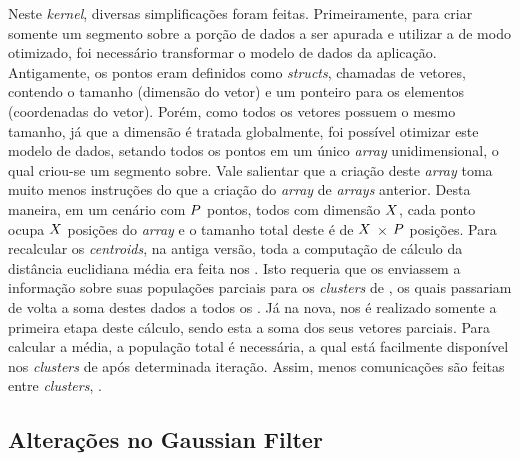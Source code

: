 \documentclass[a4paper,11pt]{article}
\begin{document}
Neste \textit{kernel}, diversas simplificações foram feitas. Primeiramente, para criar somente um segmento sobre a porção de dados a ser apurada e utilizar a \async de modo otimizado, foi necessário transformar o modelo de dados da aplicação. Antigamente, os pontos eram definidos como \textit{structs}, chamadas de vetores, contendo o tamanho (dimensão do vetor) e um ponteiro para os elementos (coordenadas do vetor). Porém, como todos os vetores possuem o mesmo tamanho, já que a dimensão é tratada globalmente, foi possível otimizar este modelo de dados, setando todos os pontos em um único \textit{array} unidimensional, o qual criou-se um segmento sobre. Vale salientar que a criação deste \textit{array} toma muito menos instruções do que a criação do \textit{array} de \textit{arrays} anterior. Desta maneira, em um cenário com $\mathnormal{P}$ pontos, todos com dimensão $\mathnormal{X}$, cada ponto ocupa $\mathnormal{X}$ posições do \textit{array} e o tamanho total deste é de $\mathnormal{X}$ $\times$ $\mathnormal{P}$ posições. Para recalcular os \textit{centroids}, na antiga versão, toda a computação de cálculo da distância euclidiana média era feita nos \ccs. Isto requeria que os \ccs enviassem a informação sobre suas populações parciais para os \textit{clusters} de \io, os quais passariam de volta a soma destes dados a todos os \ccs. Já na nova, nos \ccs é realizado somente a primeira etapa deste cálculo, sendo esta a soma dos seus vetores parciais. Para calcular a média, a população total é necessária, a qual está facilmente disponível nos \textit{clusters} de \io após determinada iteração. Assim, menos comunicações são feitas entre \textit{clusters}, .

\subsection{Alterações no Gaussian Filter}
\end{document}

